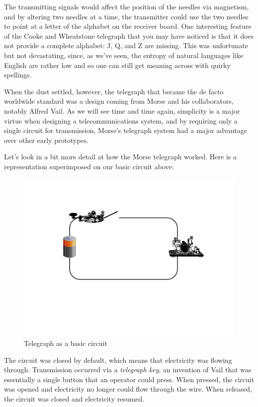 \documentclass[UTF8]{book}
\begin{document}
\begin{CJK}{UTF8}{gbsn}
The transmitting signals would affect the position of the needles via magnetism, and by altering two needles at a time, the transmitter could use the two needles to point at a letter of the alphabet on the receiver board. One interesting feature of the Cooke and Wheatstone telegraph that you may have noticed is that it does not provide a complete alphabet: J, Q, and Z are missing. This was unfortunate but not devastating, since, as we've seen, the entropy of natural languages like English are rather low and so one can still get meaning across with quirky spellings.

When the dust settled, however, the telegraph that became the de facto worldwide standard was a design coming from Morse and his collaborators, notably Alfred Vail. As we will see time and time again, simplicity is a major virtue when designing a telecommunications system, and by requiring only a single circuit for transmission, Morse's telegraph system had a major advantage over other early prototypes.

Let's look in a bit more detail at how the Morse telegraph worked. Here is a representation superimposed on our basic circuit above:

\begin{figure}[H]
\centering
\includegraphics[width=0.8\linewidth]{telegraph_as_circuit}
\caption{Telegraph as a basic circuit}
\end{figure}

The circuit was closed by default, which means that electricity was flowing through. Transmission occurred via a \emph{telegraph key}, an invention of Vail that was essentially a single button that an operator could press. When pressed, the circuit was opened and electricity no longer could flow through the wire. When released, the circuit was closed and electricity resumed.


\end{CJK}
\end{document}
